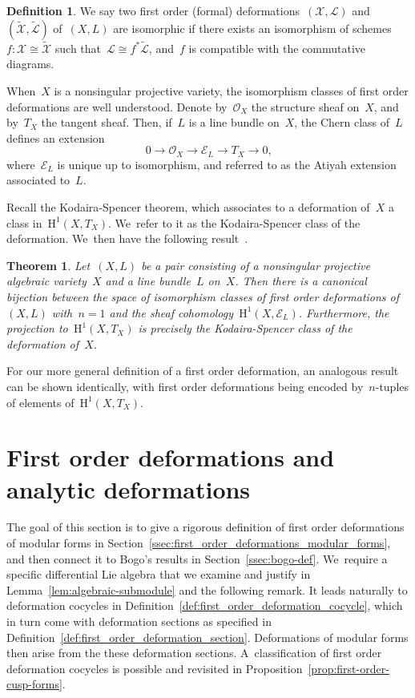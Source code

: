 \documentclass[JEP,XML,SOM,Unicode,published]{cedram}
\theoremstyle{plain}
\newtheorem{theorem}[theoremcounter]{Theorem}
\theoremstyle{definition}
\newtheorem{definition}[theoremcounter]{Definition}
\newcommand{\tx}{\text}
\newcommand{\cE}{\ensuremath{\mathcal{E}}}
\newcommand{\cL}{\ensuremath{\mathcal{L}}}
\newcommand{\cO}{\ensuremath{\mathcal{O}}}
\newcommand{\cX}{\ensuremath{\mathcal{X}}}
\newcommand{\rmH}{\ensuremath{\mathrm{H}}}
\let\wtd\widetilde
\begin{document}
\begin{definition}
\label{def:deformation_isomorphism}
We say two first order (formal) deformations~$(\cX,\cL)$ and~$(\wtd{\cX},\wtd{\cL})$ of~$(X,L)$ are isomorphic if there exists an isomorphism of schemes~$f:\cX\cong\wtd{\cX}$ such that~$\cL\cong f^*\wtd{\cL}$, and~$f$ is compatible with the commutative diagrams.
\end{definition}

When~$X$ is a nonsingular projective variety, the isomorphism classes of first order deformations are well understood. Denote by~$\cO_X$ the structure sheaf on~$X$, and by~$T_X$ the tangent sheaf. Then, if~$L$ is a line bundle on~$X$, the Chern class of~$L$ defines an extension
\begin{equation*}
0 \to \cO_X \to \cE_L \to T_X \to 0
\tx{,}
\end{equation*}
where~$\cE_L$ is unique up to isomorphism, and referred to as the Atiyah extension associated to~$L$.

Recall the Kodaira-Spencer theorem, which associates to a deformation of~$X$ a class in~$\rmH^1(X,T_X)$. We~refer to it as the Kodaira-Spencer class of the deformation. We~then have the following result~\cite[Th.\,3.3.11]{sernesi06}.

\begin{theorem}
\label{thm:first-order-class}
Let~$(X,L)$ be a pair consisting of a nonsingular projective algebraic variety~$X$ and a line bundle~$L$ on~$X$. Then there is a canonical bijection between the space of isomorphism classes of first order deformations of~$(X,L)$ with~$n=1$ and the sheaf cohomology~$\rmH^1(X,\cE_L)$. Furthermore, the projection to~$\rmH^1(X,T_X)$ is precisely the Kodaira-Spencer class of the deformation of~$X$.
\end{theorem}

For our more general definition of a first order deformation, an analogous result can be shown identically, with first order deformations being encoded by~$n$-tuples of elements of~$\rmH^1(X,T_X)$.

\section{First order deformations and analytic deformations}
\label{sec:first-order-deformations}

The goal of this section is to give a rigorous definition of first order deformations of modular forms in Section~\ref{ssec:first_order_deformations_modular_forms}, and then connect it to Bogo's results in Section~\ref{ssec:bogo-def}. We~require a specific differential Lie algebra that we examine and justify in Lemma~\ref{lem:algebraic-submodule} and the following remark. It leads naturally to deformation cocycles in Definition~\ref{def:first_order_deformation_cocycle}, which in turn come with deformation sections as specified in Definition~\ref{def:first_order_deformation_section}. Deformations of modular forms then arise from the these deformation sections. A~classification of first order deformation cocycles is possible and revisited in Proposition~\ref{prop:first-order-cusp-forms}.
\end{document}

